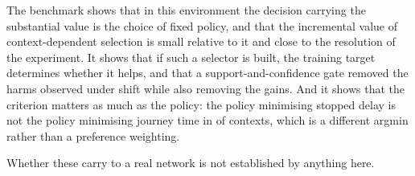 The benchmark shows that in this environment the decision carrying the
substantial value is the choice of fixed policy, and that the incremental value
of context-dependent selection is small relative to it and close to the
resolution of the experiment. It shows that if such a selector is built, the
training target determines whether it helps, and that a support-and-confidence
gate removed the harms observed under shift while also removing the gains. And
it shows that the criterion matters as much as the policy: the policy
minimising stopped delay is not the policy minimising journey time in
\NumBestCThreeDiffersPct{} of contexts, which is a different argmin rather than
a preference weighting.

Whether these carry to a real network is not established by anything here.
